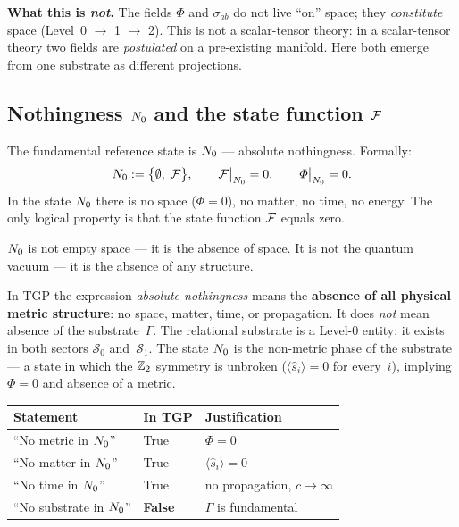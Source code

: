 \noindent\textbf{What this is \emph{not}.}\;
The fields $\Phi$ and $\sigma_{ab}$ do not live ``on'' space; they
\emph{constitute} space (Level~0 $\to$ 1 $\to$ 2).  This is not a
scalar-tensor theory: in a scalar-tensor theory two fields are
\emph{postulated} on a pre-existing manifold.  Here both emerge from
one substrate as different projections.

\subsection{Nothingness $N_0$ and the state function $\mathcal{F}$}%
\label{ssec:N0}

\begin{axiom}[Nothingness]\label{ax:N0}
The fundamental reference state is $N_0$ --- absolute nothingness.
Formally:
\begin{equation}
    N_0 := \bigl\{\emptyset,\;\mathcal{F}\bigr\},
    \qquad
    \mathcal{F}\big|_{N_0} = 0,
    \qquad
    \varPhi\big|_{N_0} = 0.
\end{equation}
In the state $N_0$ there is no space ($\Phi = 0$), no matter,
no time, no energy.  The only logical property is that the state
function $\mathcal{F}$ equals zero.
\end{axiom}

$N_0$ is not empty space --- it is the absence of space.  It is
not the quantum vacuum --- it is the absence of any structure.

\begin{remark}%
\label{rem:N0-substrat-precyzacja}
In TGP the expression \emph{absolute nothingness} means the
\textbf{absence of all physical metric structure}: no space, matter,
time, or propagation.  It does \emph{not} mean absence of the
substrate~$\Gamma$.  The relational substrate is a Level-0 entity:
it exists in both sectors $\mathcal{S}_0$ and~$\mathcal{S}_1$.
The state $N_0$ is the non-metric phase of the substrate ---
a state in which the $\mathbb{Z}_2$ symmetry is unbroken
($\langle\hat{s}_i\rangle = 0$ for every~$i$), implying
$\Phi = 0$ and absence of a metric.

\begin{center}
\small
\begin{tabular}{@{}p{4.5cm}p{2.6cm}p{4.5cm}@{}}
\toprule
\textbf{Statement} & \textbf{In TGP} & \textbf{Justification} \\
\midrule
``No metric in $N_0$'' & True & $\Phi = 0$ \\
``No matter in $N_0$'' & True & $\langle\hat{s}_i\rangle = 0$ \\
``No time in $N_0$'' & True & no propagation, $c \to \infty$ \\
``No substrate in $N_0$'' & \textbf{False} & $\Gamma$ is fundamental \\
\bottomrule
\end{tabular}
\end{center}
\end{remark}

